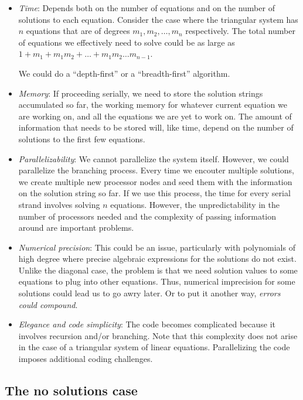 \documentclass[10pt]{amsart}
\begin{document}
\begin{itemize}
\item {\em Time}: Depends both on the number of equations and on the
  number of solutions to each equation. Consider the case where the
  triangular system has $n$ equations that are of degrees
  $m_1,m_2,\dots,m_n$ respectively. The total number of equations we
  effectively need to solve could be as large as $1 + m_1 + m_1m_2 +
  \dots + m_1m_2 \dots m_{n-1}$.

  We could do a ``depth-first'' or a ``breadth-first'' algorithm.

\item {\em Memory}: If proceeding serially, we need to store the
  solution strings accumulated so far, the working memory for whatever
  current equation we are working on, and all the equations we are yet
  to work on. The amount of information that needs to be stored will,
  like time, depend on the number of solutions to the first few equations.

\item {\em Parallelizability}: We cannot parallelize the system
  itself. However, we could parallelize the branching process. Every
  time we encouter multiple solutions, we create multiple new
  processor nodes and seed them with the information on the solution
  string so far. If we use this process, the time for every serial
  strand involves solving $n$ equations. However, the unpredictability
  in the number of processors needed and the complexity of passing
  information around are important problems.

\item {\em Numerical precision}: This could be an issue, particularly
  with polynomials of high degree where precise algebraic expressions
  for the solutions do not exist. Unlike the diagonal case, the
  problem is that we need solution values to some equations to plug
  into other equations. Thus, numerical imprecision for some solutions
  could lead us to go awry later. Or to put it another way, {\em
    errors could compound}.

\item {\em Elegance and code simplicity}: The code becomes complicated
  because it involves recursion and/or branching. Note that this
  complexity does not arise in the case of a triangular system of
  linear equations. Parallelizing the code imposes additional coding
  challenges.
\end{itemize}

\subsection{The no solutions case}
\end{document}
